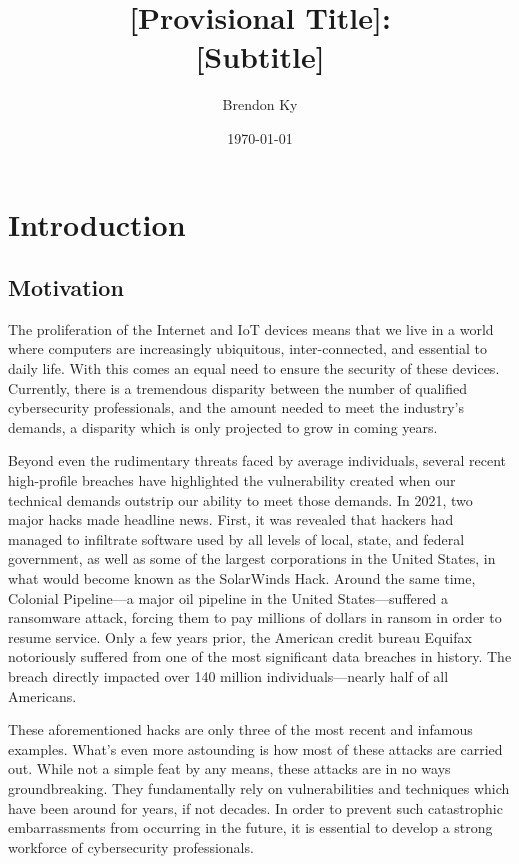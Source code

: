 \documentclass{article}
\title{
    [Provisional Title]: \\
    \large [Subtitle]
}
\author{Brendon Ky}
\date{\today}
\begin{document}
\maketitle

\section{Introduction}

    \subsection{Motivation} %

    The proliferation of the Internet and IoT devices means that we live in a world where computers are increasingly ubiquitous, inter-connected, and essential to daily life. 
    With this comes an equal need to ensure the security of these devices. 
    Currently, there is a tremendous disparity between the number of qualified cybersecurity professionals, and the amount needed to meet the industry's demands, a disparity which is only projected to grow in coming years.
    
    Beyond even the rudimentary threats faced by average individuals, several recent high-profile breaches have highlighted the vulnerability created when our technical demands outstrip our ability to meet those demands. 
    In 2021, two major hacks made headline news. 
    First, it was revealed that hackers had managed to infiltrate software used by all levels of local, state, and federal government, as well as some of the largest corporations in the United States, in what would become known as the SolarWinds Hack.
    Around the same time, Colonial Pipeline---a major oil pipeline in the United States---suffered a ransomware attack, forcing them to pay millions of dollars in ransom in order to resume service. 
    Only a few years prior, the American credit bureau Equifax notoriously suffered from one of the most significant data breaches in history. 
    The breach directly impacted over 140 million individuals---nearly half of all Americans. 
    
    These aforementioned hacks are only three of the most recent and infamous examples. 
    What's even more astounding is how most of these attacks are carried out. 
    While not a simple feat by any means, these attacks are in no ways groundbreaking.
    They fundamentally rely on vulnerabilities and techniques which have been around for years, if not decades. 
    In order to prevent such catastrophic embarrassments from occurring in the future, it is essential to develop a strong workforce of cybersecurity professionals. 
\end{document}

